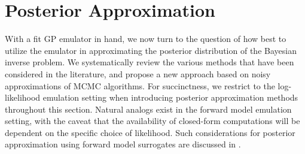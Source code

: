 \documentclass[12pt]{article}
\begin{document}
\section{Posterior Approximation} \label{sec:post_approx}
With a fit GP emulator in hand, we now turn to the question of how best to utilize the emulator in approximating the posterior 
distribution of the Bayesian inverse problem. We systematically review the various methods that have been considered in the 
literature, and propose a new approach based on noisy approximations of MCMC algorithms. For succinctness, we restrict 
to the log-likelihood emulation setting when introducing posterior approximation methods throughout this section. Natural 
analogs exist in the forward model emulation setting, with the caveat that the availability of closed-form computations will 
be dependent on the specific choice of likelihood. Such considerations for posterior approximation using forward model 
surrogates are discussed in . 

\end{document}
